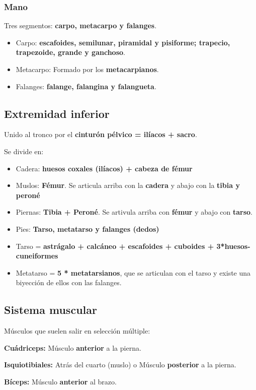 \documentclass{article}
\begin{document}
\subsubsection{Mano}
Tres segmentos: \textbf{carpo, metacarpo y falanges}.
\begin{itemize}
  \item Carpo: \textbf{escafoides, semilunar, piramidal y pisiforme; trapecio, trapezoide, grande y ganchoso}.
  \item Metacarpo: Formado por los \textbf{metacarpianos}.
  \item Falanges: \textbf{falange, falangina y falangueta}.
\end{itemize}

\subsection{Extremidad inferior}
Unido al tronco por el \textbf{cinturón pélvico = ilíacos + sacro}.

Se divide en:
\begin{itemize}
  \item Cadera: \textbf{huesos coxales (ilíacos) + cabeza de fémur}
  \item Muslos: \textbf{Fémur}. Se articula arriba con la \textbf{cadera} y abajo con la \textbf{tibia y peroné}
\item Piernas: \textbf{Tibia + Peroné}. Se artivula arriba con \textbf{fémur} y abajo con \textbf{tarso}.
\item Pies: \textbf{Tarso, metatarso y falanges (dedos)}
\item Tarso = \textbf{astrágalo + calcáneo + escafoides + cuboides + 3*huesos-cuneiformes}
\item Metatarso = \textbf{5 * metatarsianos}, que se articulan con el tarso y existe 
  una biyección de ellos con las falanges.
\end{itemize}
\subsection{Sistema muscular}

Músculos que suelen salir en selección múltiple:

\textbf{Cuádriceps:} Músculo \textbf{anterior} a la pierna.

  \textbf{Isquiotibiales: } Atrás del cuarto (muslo) o Músculo \textbf{posterior} a la pierna.

  \textbf{Bíceps: } Músculo \textbf{anterior} al brazo.
\end{document}
